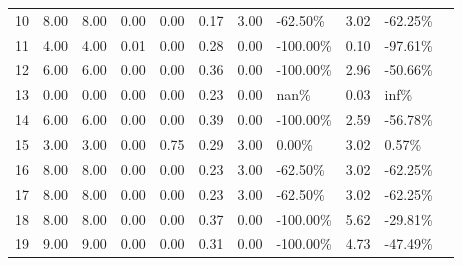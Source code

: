 \begin{frame}
\begin{tabular}{lllrrrlllll}
    10 & 8.00                 & 8.00                   & 0.00                    & 0.00                                        & 0.17 & 3.00 & -62.50\%  & 3.02  & -62.25\% \\
    11 & 4.00                 & 4.00                   & 0.01                    & 0.00                                        & 0.28 & 0.00 & -100.00\% & 0.10  & -97.61\% \\
    12 & 6.00                 & 6.00                   & 0.00                    & 0.00                                        & 0.36 & 0.00 & -100.00\% & 2.96  & -50.66\% \\
    13 & 0.00                 & 0.00                   & 0.00                    & 0.00                                        & 0.23 & 0.00 & nan\%     & 0.03  & inf\%    \\
    14 & 6.00                 & 6.00                   & 0.00                    & 0.00                                        & 0.39 & 0.00 & -100.00\% & 2.59  & -56.78\% \\
    15 & 3.00                 & 3.00                   & 0.00                    & 0.75                                        & 0.29 & 3.00 & 0.00\%    & 3.02  & 0.57\%   \\
    16 & 8.00                 & 8.00                   & 0.00                    & 0.00                                        & 0.23 & 3.00 & -62.50\%  & 3.02  & -62.25\% \\
    17 & 8.00                 & 8.00                   & 0.00                    & 0.00                                        & 0.23 & 3.00 & -62.50\%  & 3.02  & -62.25\% \\
    18 & 8.00                 & 8.00                   & 0.00                    & 0.00                                        & 0.37 & 0.00 & -100.00\% & 5.62  & -29.81\% \\
    19 & 9.00                 & 9.00                   & 0.00                    & 0.00                                        & 0.31 & 0.00 & -100.00\% & 4.73  & -47.49\% \\
  \end{tabular}
  \normalsize
\end{frame}

